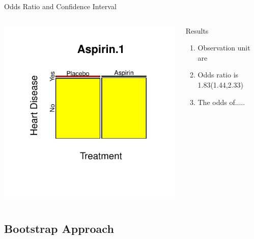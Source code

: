 \documentclass[a4paper,9pt]{beamer}\usepackage[]{graphicx}\usepackage[]{color}
\makeatletter
\def\maxwidth{ %
  \ifdim\Gin@nat@width>\linewidth
    \linewidth
  \else
    \Gin@nat@width
  \fi
}
\newenvironment{knitrout}{}{} %
\makeatother
\begin{document}
\begin{frame}{Odds Ratio and Confidence Interval}
\begin{columns}
\begin{knitrout}
\color{fgcolor}
\includegraphics[width=\maxwidth]{figure/oddsplot-1} 

\end{knitrout}
\begin{block}{Results}
\begin{enumerate}[i]
\item Observation unit are
\item Odds ratio is 1.83(1.44,2.33)
\item The odds of.....
\end{enumerate}
\end{block}
\end{columns}
\end{frame}

\subsection{Bootstrap Approach}
\end{document}
